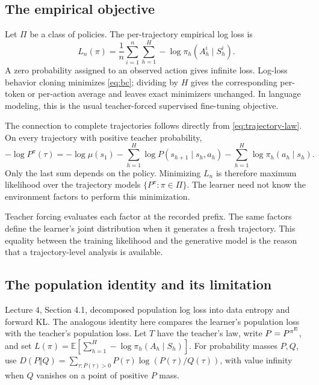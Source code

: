\documentclass[11pt,twoside]{article}
\newcommand{\E}{\mathbb E}
\newcommand{\KL}{D}
\theoremstyle{definition}
\theoremstyle{remark}
\begin{document}
\subsection{The empirical objective}

Let $\Pi$ be a class of policies. The per-trajectory empirical log loss is
\begin{equation}
 L_n(\pi)
   =\frac1n\sum_{i=1}^n\sum_{h=1}^H
       -\log\pi_h(A_h^i\mid S_h^i).
 \label{eq:bc}
\end{equation}
A zero probability assigned to an observed action gives infinite loss.
Log-loss behavior cloning minimizes \cref{eq:bc}; dividing by $H$ gives
the corresponding per-token or per-action average and leaves exact
minimizers unchanged. In language modeling, this is the usual teacher-forced
supervised fine-tuning objective.

The connection to complete trajectories follows directly from
\cref{eq:trajectory-law}. On every trajectory with positive teacher
probability,
\begin{equation}
 -\log P^\pi(\tau)=
 -\log\mu(s_1)-\sum_{h=1}^H\log P(s_{h+1}\mid s_h,a_h)
 -\sum_{h=1}^H\log\pi_h(a_h\mid s_h).
 \label{eq:likelihood-factors}
\end{equation}
Only the last sum depends on the policy. Minimizing $L_n$ is
therefore maximum likelihood over the trajectory models
$\{P^\pi:\pi\in\Pi\}$. The learner need not know the environment factors
to perform this minimization.

Teacher forcing evaluates each factor at the recorded prefix. The same
factors define the learner's joint distribution when it generates a fresh
trajectory. This equality between the training likelihood and the generative
model is the reason that a trajectory-level analysis is available.

\subsection{The population identity and its limitation}

Lecture 4, Section 4.1, decomposed population log loss into data entropy
and forward KL. The analogous identity here compares the learner's
population loss with the teacher's population loss.
Let $T$ have the teacher's law, write $P=P^{\pi^{\rm E}}$, and set
$L(\pi)=\E[\sum_{h=1}^H-\log\pi_h(A_h\mid S_h)]$.
For probability masses $P,Q$, use
$\KL(P\Vert Q)=\sum_{\tau:P(\tau)>0}P(\tau)\log(P(\tau)/Q(\tau))$,
with value infinity when $Q$ vanishes on a point of positive $P$ mass.
\end{document}

